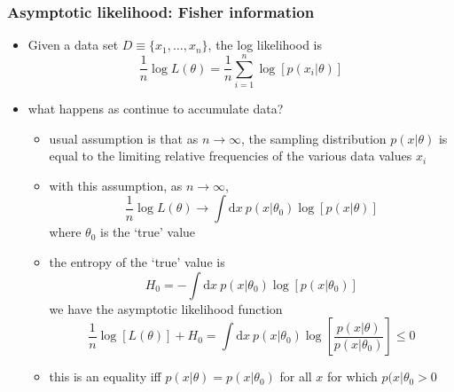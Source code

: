 \documentclass[../jaynes_prob_theory_notes.tex]{subfiles}
\begin{document}
            \subsubsection{Asymptotic likelihood: Fisher information}
                \begin{itemize}
                    \item Given a data set $D \equiv \{x_1, \ldots, x_n\}$, the log likelihood is 
                        \begin{equation*}
                            \frac{1}{n} \log L(\theta) = \frac{1}{n} \sum\limits^{n}_{i=1} \log [p(x_i | \theta)]
                        \end{equation*}
                    \item what happens as continue to accumulate data?
                        \begin{itemize}
                            \item usual assumption is that as $n \rightarrow \infty$, the sampling distribution $p(x|{\theta})$ is equal to the limiting relative frequencies of the various data values $x_i$
                            \item with this assumption, as $n \rightarrow \infty$,
                                \begin{equation*}
                                    \frac{1}{n} \log L(\theta) \rightarrow \int \mathrm{d}x~p(x|{\theta}_{0}) \log [p(x|{\theta})]
                                \end{equation*}
                                where ${\theta}_{0}$ is the `true' value
                            \item the entropy of the `true' value is
                                \begin{equation*}
                                    H_0 = -\int \mathrm{d}x~p(x|{\theta}_{0}) \log [p(x|{\theta}_{0})]
                                \end{equation*}
                                we have the asymptotic likelihood function
                                \begin{equation*}
                                    \frac{1}{n} \log [L(\theta)] + H_0 = \int \mathrm{d}x~p(x|{\theta}_{0}) \log \left[ \frac{p(x|\theta)}{p(x|{\theta}_{0})} \right] \leq 0
                                \end{equation*}
                            \item this is an equality iff $p(x|{\theta}) = p(x|{\theta}_{0})$ for all $x$ for which $p(x|{\theta}_{0} > 0$

\end{itemize}
\end{itemize}
\end{document}
